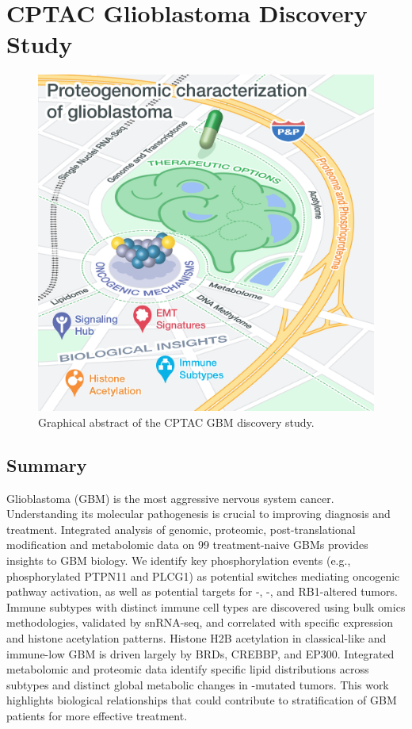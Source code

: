 \chapter{CPTAC Glioblastoma Discovery Study}
\label{chap:cptac-gbm-discov}


\begin{figure}[tbp]
    \centering
    \includegraphics[width=0.5\linewidth]{figures/chap04_cptac_gbm_discov/graphical_abstract.png}
    \caption{Graphical abstract of the CPTAC GBM discovery study.}
    \label{fig:gbm-graphical-abstract}
\end{figure}


\section{Summary}
Glioblastoma (GBM) is the most aggressive nervous system cancer. Understanding its molecular pathogenesis is crucial to improving diagnosis and treatment. Integrated analysis of genomic, proteomic, post-translational modification and metabolomic data on 99 treatment-naive GBMs provides insights to GBM biology. We identify key phosphorylation events (e.g., phosphorylated PTPN11 and PLCG1) as potential switches mediating oncogenic pathway activation, as well as potential targets for -, -, and RB1-altered tumors. Immune subtypes with distinct immune cell types are discovered using bulk omics methodologies, validated by snRNA-seq, and correlated with specific expression and histone acetylation patterns. Histone H2B acetylation in classical-like and immune-low GBM is driven largely by BRDs, CREBBP, and EP300. Integrated metabolomic and proteomic data identify specific lipid distributions across subtypes and distinct global metabolic changes in -mutated tumors. This work highlights biological relationships that could contribute to stratification of GBM patients for more effective treatment.


